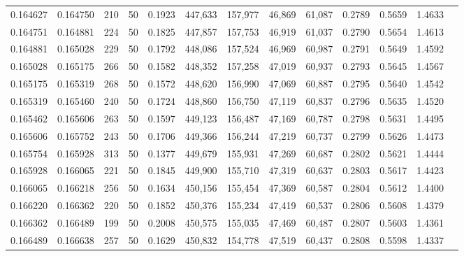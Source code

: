 \begin{tabular}{rrrrrrrrrrrrr}
0.164627 & 0.164750 &   210 &  50 &                                     0.1923 & 447,633 & 157,977 &  46,869 &  61,087 & 0.2789 & 0.5659 & 1.4633 \\
0.164751 & 0.164881 &   224 &  50 &                                     0.1825 & 447,857 & 157,753 &  46,919 &  61,037 & 0.2790 & 0.5654 & 1.4613 \\
0.164881 & 0.165028 &   229 &  50 &                                     0.1792 & 448,086 & 157,524 &  46,969 &  60,987 & 0.2791 & 0.5649 & 1.4592 \\
0.165028 & 0.165175 &   266 &  50 &                                     0.1582 & 448,352 & 157,258 &  47,019 &  60,937 & 0.2793 & 0.5645 & 1.4567 \\
0.165175 & 0.165319 &   268 &  50 &                                     0.1572 & 448,620 & 156,990 &  47,069 &  60,887 & 0.2795 & 0.5640 & 1.4542 \\
0.165319 & 0.165460 &   240 &  50 &                                     0.1724 & 448,860 & 156,750 &  47,119 &  60,837 & 0.2796 & 0.5635 & 1.4520 \\
0.165462 & 0.165606 &   263 &  50 &                                     0.1597 & 449,123 & 156,487 &  47,169 &  60,787 & 0.2798 & 0.5631 & 1.4495 \\
0.165606 & 0.165752 &   243 &  50 &                                     0.1706 & 449,366 & 156,244 &  47,219 &  60,737 & 0.2799 & 0.5626 & 1.4473 \\
0.165754 & 0.165928 &   313 &  50 &                                     0.1377 & 449,679 & 155,931 &  47,269 &  60,687 & 0.2802 & 0.5621 & 1.4444 \\
0.165928 & 0.166065 &   221 &  50 &                                     0.1845 & 449,900 & 155,710 &  47,319 &  60,637 & 0.2803 & 0.5617 & 1.4423 \\
0.166065 & 0.166218 &   256 &  50 &                                     0.1634 & 450,156 & 155,454 &  47,369 &  60,587 & 0.2804 & 0.5612 & 1.4400 \\
0.166220 & 0.166362 &   220 &  50 &                                     0.1852 & 450,376 & 155,234 &  47,419 &  60,537 & 0.2806 & 0.5608 & 1.4379 \\
0.166362 & 0.166489 &   199 &  50 &                                     0.2008 & 450,575 & 155,035 &  47,469 &  60,487 & 0.2807 & 0.5603 & 1.4361 \\
0.166489 & 0.166638 &   257 &  50 &                                     0.1629 & 450,832 & 154,778 &  47,519 &  60,437 & 0.2808 & 0.5598 & 1.4337 \\

\end{tabular}
